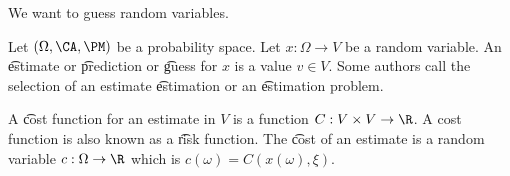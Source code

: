 

We want to guess random variables.


Let $(\Omega, \CA, \PM)$ be a probability space.
Let $x: \Omega \to V$ be a random variable.
An \t{estimate} or \t{prediction} or \t{guess} for $x$ is a value $v \in V$.
Some authors call the selection of an estimate \t{estimation} or an \t{estimation problem}.


A \t{cost function} for an estimate in $V$ is a function $C: V \times V \to \R$.
A cost function is also known as a \t{risk function}.
The \t{cost} of an estimate is a random variable $c: \Omega \to \R$ which is $c(\omega) = C(x(\omega), \xi)$.

\blankpage
